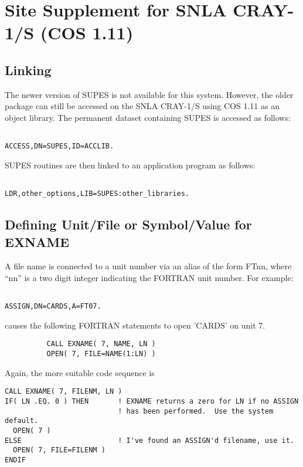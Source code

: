 \cleardoublepage

\section{Site Supplement for SNLA CRAY-1/S (COS 1.11)}

\subsection{Linking}
The newer version of SUPES is not available for this system.
However,
the older package can still be accessed on the SNLA CRAY-1/S
using COS 1.11 as an object library.
The permanent dataset containing SUPES is accessed as follows:
\begin{verbatim}

ACCESS,DN=SUPES,ID=ACCLIB.

\end{verbatim}
SUPES routines are then linked to an application program as follows:

\begin{verbatim}

LDR,other_options,LIB=SUPES:other_libraries.

\end{verbatim}

\subsection{Defining Unit/File or Symbol/Value for EXNAME}
A file name is connected to a unit number via an alias of the form FTnn,
where ``nn'' is a two digit integer indicating the FORTRAN unit number. For
example:
\begin{verbatim}

ASSIGN,DN=CARDS,A=FT07.

\end{verbatim}
causes the following FORTRAN statements to open 'CARDS' on unit 7.
\begin{verbatim}
          CALL EXNAME( 7, NAME, LN )
          OPEN( 7, FILE=NAME(1:LN) )
\end{verbatim}
Again,
the more suitable code sequence is
\begin{verbatim}
CALL EXNAME( 7, FILENM, LN )
IF( LN .EQ. 0 ) THEN       ! EXNAME returns a zero for LN if no ASSIGN
                           ! has been performed.  Use the system default.
  OPEN( 7 )
ELSE                       ! I've found an ASSIGN'd filename, use it.
  OPEN( 7, FILE=FILENM )
ENDIF
\end{verbatim}

